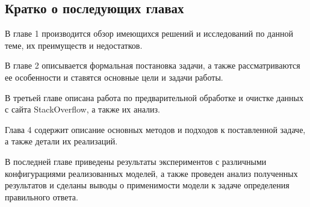 \documentclass[../diploma.tex]{subfiles}
\begin{document}
    \subsection*{Кратко о последующих главах}

	В главе 1 производится обзор имеющихся решений и исследований по данной теме, их преимуществ и недостатков.

	В главе 2 описывается формальная постановка задачи, а также рассматриваются ее особенности и ставятся основные цели и задачи работы.

	В третьей главе описана работа по предварительной обработке и очистке данных с сайта StackOverflow, а также их анализ.

	Глава 4 содержит описание основных методов и подходов к поставленной задаче, а также детали их реализаций.

	В последней главе приведены результаты экспериментов с различными конфигурациями реализованных моделей, 
	а также проведен анализ полученных результатов и сделаны выводы о применимости модели к задаче определения правильного ответа.
\end{document}

